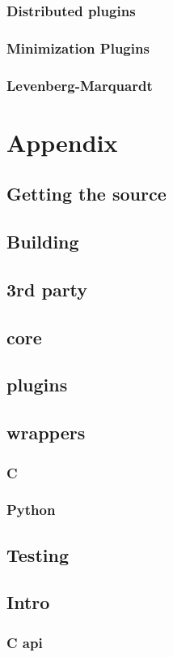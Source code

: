 \documentclass[12pt, letter, oneside]{book}
\begin{document}
\subsubsection{Distributed plugins }
\subsubsection{Minimization Plugins}
\subsubsection{Levenberg-Marquardt}
\section{Appendix}
\subsection{Getting the source}
\subsection{Building}
\subsection{3rd party}
\subsection{core}
\subsection{plugins}
\subsection{wrappers}
\subsubsection{C}
\subsubsection{Python}
\subsection{Testing}
\subsection{Intro}
\subsubsection{C api}
\end{document}
